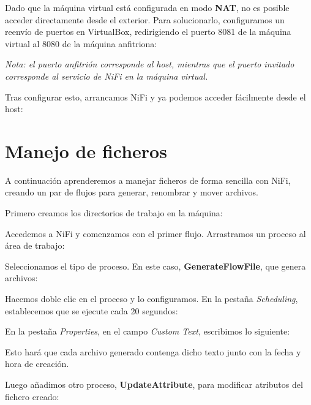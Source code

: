 \documentclass{../../miPlantilla}
\begin{document}

Dado que la máquina virtual está configurada en modo \textbf{NAT}, no es posible acceder directamente desde el exterior. Para solucionarlo, configuramos un reenvío de puertos en VirtualBox, redirigiendo el puerto 8081 de la máquina virtual al 8080 de la máquina anfitriona:


\textit{Nota: el puerto anfitrión corresponde al host, mientras que el puerto invitado corresponde al servicio de NiFi en la máquina virtual.}

\newpage

Tras configurar esto, arrancamos NiFi y ya podemos acceder fácilmente desde el host:


\newpage

\section{Manejo de ficheros}
A continuación aprenderemos a manejar ficheros de forma sencilla con NiFi, creando un par de flujos para generar, renombrar y mover archivos.  

Primero creamos los directorios de trabajo en la máquina:


Accedemos a NiFi y comenzamos con el primer flujo. Arrastramos un proceso al área de trabajo:


Seleccionamos el tipo de proceso. En este caso, \textbf{GenerateFlowFile}, que genera archivos:


\newpage

Hacemos doble clic en el proceso y lo configuramos. En la pestaña \textit{Scheduling}, establecemos que se ejecute cada 20 segundos:


En la pestaña \textit{Properties}, en el campo \textit{Custom Text}, escribimos lo siguiente:


Esto hará que cada archivo generado contenga dicho texto junto con la fecha y hora de creación.  

Luego añadimos otro proceso, \textbf{UpdateAttribute}, para modificar atributos del fichero creado:
\end{document}

